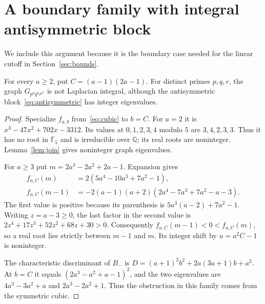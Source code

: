 \section{A boundary family with integral antisymmetric block}

We include this argument because it is the boundary case
needed for the linear cutoff in Section~\ref{sec:bounds}.

\begin{theorem}
\label{thm:boundary}
For every $a\geq2$, put $C=(a-1)(2a-1)$. For distinct primes $p,q,r$,
the graph $G_{p^a q^a r^C}$ is not Laplacian integral, although the
antisymmetric block~\eqref{eq:antisymmetric} has integer eigenvalues.
\end{theorem}
\begin{proof}
Specialize $f_{a,b}$ from~\eqref{eq:cubic} to $b=C$.
For $a=2$ it is $x^3-47x^2+702x-3312$. Its values at
$0,1,2,3,4$ modulo $5$ are $3,4,2,3,3$. Thus it has no root in
$\mathbb F_5$ and is irreducible over $\mathbb Q$; its real roots
are noninteger. Lemma~\ref{lem:join} gives noninteger graph eigenvalues.

For $a\geq3$ put $m=2a^3-2a^2+2a-1$. Expansion gives
\begin{align*}
f_{a,C}(m)&=2(5a^4-10a^3+7a^2-1),\\
f_{a,C}(m-1)&=-2(a-1)(a+2)(2a^4-7a^3+7a^2-a-3).
\end{align*}
The first value is positive because its parenthesis is
$5a^3(a-2)+7a^2-1$. Writing $z=a-3\geq0$, the last factor in the
second value is
$2z^4+17z^3+52z^2+68z+30>0$.
Consequently $f_{a,C}(m-1)<0<f_{a,C}(m)$, so a real root lies strictly
between $m-1$ and $m$. Its integer shift by $u=a^2C-1$ is noninteger.

The characteristic discriminant of $B_-$ is
$D=(a+1)^2b^2+2a(3a+1)b+a^2$.
At $b=C$ it equals $(2a^3-a^2+a-1)^2$, and the two eigenvalues are
$4a^3-3a^2+a$ and $2a^3-2a^2+1$. Thus the obstruction in this family
comes from the symmetric cubic.
\end{proof}
